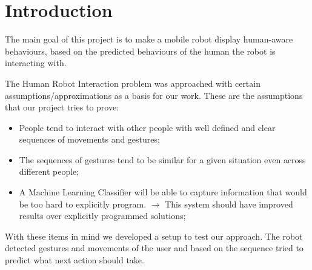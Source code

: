 
\section{Introduction}
The main goal of this project is to make a mobile robot display human-aware behaviours, based on the predicted behaviours of the human the robot is interacting with. 



The Human Robot Interaction problem was approached with certain assumptions/approximations as a basis for our work. These are the assumptions that our project tries to prove: 

\begin{itemize}
\item People tend to interact with other people with well defined and clear sequences of movements and gestures;
\item The sequences of gestures tend to be similar for a given situation even across different people;
\item A Machine Learning Classifier will be able to capture information that would be too hard to explicitly program. $\rightarrow$ This system should have improved results over explicitly programmed solutions;
\end{itemize}

With these items in mind we developed a setup to test our approach. The robot detected gestures and movements of the user and based on the sequence tried to predict what next action should take.



